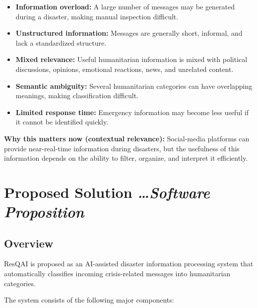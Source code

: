 \documentclass[11pt,a4paper]{article}
\newcommand{\BvrHint}[1]{%
  {\normalfont\normalsize\itshape\hfill #1}}
\begin{document}
\begin{itemize}[leftmargin=0.7cm]

    \item \textbf{Information overload:} A large number of messages may be
    generated during a disaster, making manual inspection difficult.

    \item \textbf{Unstructured information:} Messages are generally short,
    informal, and lack a standardized structure.

    \item \textbf{Mixed relevance:} Useful humanitarian information is mixed
    with political discussions, opinions, emotional reactions, news, and
    unrelated content.

    \item \textbf{Semantic ambiguity:} Several humanitarian categories can
    have overlapping meanings, making classification difficult.

    \item \textbf{Limited response time:} Emergency information may become
    less useful if it cannot be identified quickly.

\end{itemize}

\textbf{Why this matters now (contextual relevance):}
Social-media platforms can provide near-real-time information during
disasters, but the usefulness of this information depends on the ability to
filter, organize, and interpret it efficiently.


\section{Proposed Solution %
\BvrHint{\ldots Software Proposition}}

\subsection{Overview}

ResQAI is proposed as an AI-assisted disaster information processing system
that automatically classifies incoming crisis-related messages into
humanitarian categories.

The system consists of the following major components:
\end{document}
